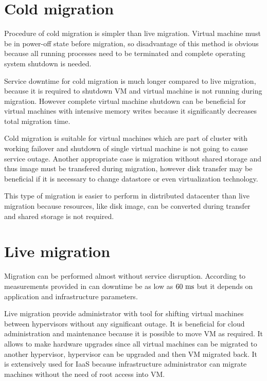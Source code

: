 \section{Cold migration}
Procedure of cold migration is simpler than live migration. Virtual machine must be in power-off state before migration, so disadvantage of this method is obvious because all running processes need to be terminated and complete operating system shutdown is needed.

Service downtime for cold migration is much longer compared to live migration, because it is required to shutdown \Ac{VM} and virtual machine is not running during migration. However complete virtual machine shutdown can be beneficial for virtual machines with intensive memory writes because it significantly decreases total migration time. 

Cold migration is suitable for virtual machines which are part of cluster with working failover and shutdown of single virtual machine is not going to cause service outage. Another appropriate case is migration without shared storage and thus image must be transfered during migration, however disk transfer may be beneficial if it is necessary to change datastore or even virtualization technology.

This type of migration is easier to perform in distributed datacenter than live migration because resources, like disk image, can be converted during transfer and shared storage is not required.


\section{Live migration}

Migration can be performed  almost without service disruption. According to measurements provided in \cite{live-migration-of-vms} can downtime be as low as $60~\mathrm{ms}$ but it depends on application and infrastructure parameters.

Live migration provide administrator with tool for shifting virtual machines between hypervisors without any significant outage. It is beneficial for cloud administration and maintenance because it is possible to move \Ac{VM} as required. It allows to make hardware upgrades since all virtual machines can be migrated to another hypervisor, hypervisor can be upgraded and then \Ac{VM} migrated back. 
It is extensively used for \Ac{IaaS} because infrastructure administrator can migrate machines without the need of root access into \Ac{VM}. 

